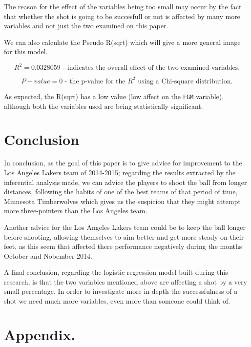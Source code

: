 \documentclass[
  11pt,
]{article}
\begin{document}
The reason for the effect of the variables being too small may occur by the fact that whether the shot is going to be succesfull or not is affected by many more variables and not just the two examined on this paper.

We can also calculate the Pseudo R(sqrt) which will give a more general image for this model.

\[R^2 = \text{0.0328059 - indicates the overall effect of the two examined variables.}\]

\[P-value = \text{0 - the p-value for the } R^2 \text{ using a Chi-square distribution.}\]

As expected, the R(sqrt) has a low value (low affect on the \texttt{FGM} variable), although both the variables used are being statistically significant.

\hypertarget{conclusion}{%
\section{Conclusion}\label{conclusion}}

In conclusion, as the goal of this paper is to give advice for improvement to the Los Angeles Lakers team of 2014-2015; regarding the results extracted by the inferential analysis made, we can advice the players to shoot the ball from longer distances, following the habits of one of the best teams of that period of time, Minnesota Timberwolves which gives us the suspicion that they might attempt more three-pointers than the Los Angeles team.

Another advice for the Los Angeles Lakers team could be to keep the ball longer before shooting, allowing themselves to aim better and get more steady on their feet, as this seem that affected there performance negatively during the months October and Nobember 2014.

A final conclusion, regarding the logistic regression model built during this research, is that the two variables mentioned above are affecting a shot by a very small percentage. In order to investigate more in depth the successfulness of a shot we need much more variables, even more than someone could think of.

\pagebreak

\hypertarget{appendix.}{%
\section{Appendix.}\label{appendix.}}
\end{document}
